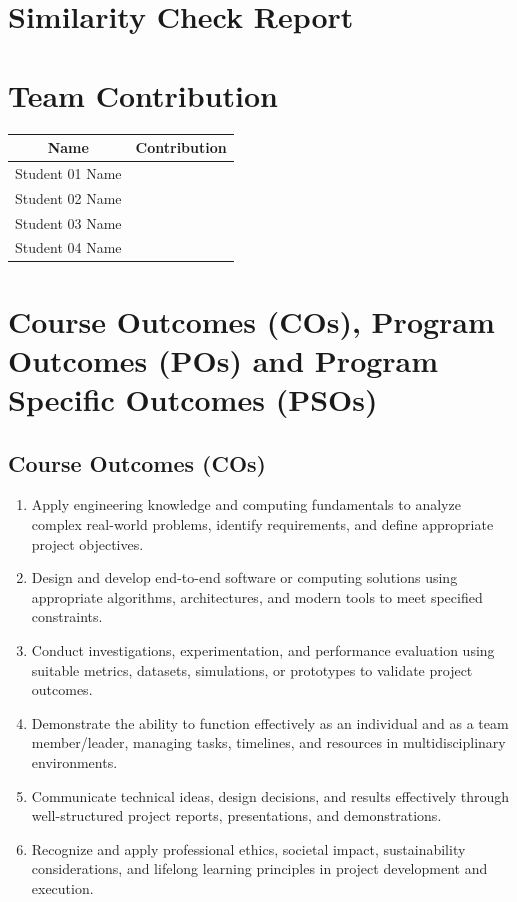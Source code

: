 \documentclass[12pt,a4paper]{report}
\begin{document}
\newpage
\section*{Similarity Check Report}


\newpage
\section*{Team Contribution}

\begin{tabular}{|p{5cm}| p{10cm}|}
\hline
\multicolumn{1}{|c|}{\textbf{Name}} & \multicolumn{1}{|c|}{\textbf{Contribution}}\\ \hline
Student 01 Name & \\ \hline
Student 02 Name & \\ \hline
Student 03 Name & \\ \hline
Student 04 Name & \\ \hline
\end{tabular}


\newpage
\section*{Course Outcomes (COs), Program Outcomes (POs) and Program Specific Outcomes (PSOs)}


\subsection*{Course Outcomes (COs)}
\begin{enumerate}[leftmargin=3em]
	\item[\textbf{CO1:}] Apply engineering knowledge and computing fundamentals to analyze complex real-world problems, identify requirements, and define appropriate project objectives.
	\item[\textbf{CO2:}] Design and develop end-to-end software or computing solutions using appropriate algorithms, architectures, and modern tools to meet specified constraints.
	\item[\textbf{CO3:}] Conduct investigations, experimentation, and performance evaluation using suitable metrics, datasets, simulations, or prototypes to validate project outcomes.
	\item[\textbf{CO4:}] Demonstrate the ability to function effectively as an individual and as a team member/leader, managing tasks, timelines, and resources in multidisciplinary environments.
	\item[\textbf{CO5:}] Communicate technical ideas, design decisions, and results effectively through well-structured project reports, presentations, and demonstrations.
	\item[\textbf{CO6:}] Recognize and apply professional ethics, societal impact, sustainability considerations, and lifelong learning principles in project development and execution.
\end{enumerate}
\end{document}
